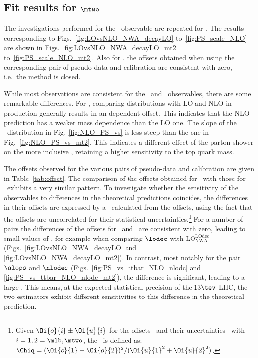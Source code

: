 \boldmath
\subsection{Fit results for $\mtwo$}
\unboldmath


The investigations performed for the \mlb\ observable are repeated for \mtwo.
%
 The results corresponding to Figs.~\ref{fig:LOvsNLO_NWA_decayLO}
 to~\ref{fig:PS_scale_NLO} are shown in Figs.~\ref{fig:LOvsNLO_NWA_decayLO_mt2}
 to~\ref{fig:PS_scale_NLO_mt2}.
%
 Also for \mtwo, the offsets obtained when using the corresponding pair of
 pseudo-data and calibration are consistent with zero, i.e.~the method is
 closed.


 While most observations are consistent for the \mlb\ and \mtwo\ observables,
 there are some remarkable differences.
%
 For \mtwo, comparing distributions with LO and NLO in production generally results in
 an \mt\-dependent offset. 
This indicates that the NLO prediction has a weaker mass dependence
than the LO one.
%
 The slope of the \mlb\ distribution in
 Fig.~\ref{fig:NLO_PS_vs} is less steep than the one in Fig.~\ref{fig:NLO_PS_vs_mt2}. This indicates a
 different effect of the parton shower
 on the more inclusive \mtwo, retaining a higher sensitivity to the
 top quark mass.


 The offsets observed for the various pairs of pseudo-data and calibration are
 given in Table~\ref{tab:offset}.
%
 The comparison of the offsets obtained for \mtwo\ with those for \mlb\
 exhibits a very similar pattern.
 To investigate whether the sensitivity of the observables to differences in the
 theoretical predictions coincides, the differences in their offsets are
 expressed by a \Chiq\ calculated from the offsets, using the fact that the
 offsets are uncorrelated for their statistical uncertainties.\footnote{Given
   $\pm {}$ for the offsets \Oi{o}{i}\ and their uncertainties
   \Oi{u}{i}\ with $i=1,2=\mlb, \mtwo$, the \Chiq\ is defined as:
   $\Chiq=(\Oi{o}{1}-\Oi{o}{2})^2/ (\Oi{u}{1}^2+\Oi{u}{2}^2)$.}
For a number of pairs the differences of the offsets for \mlb\ and \mtwo\ are
 consistent with zero, leading to small values of \Chiq,
for example when comparing $\lodec$ with $\mathrm{LO_{NWA}^{LOdec}}$
 (Figs.~\ref{fig:LOvsNLO_NWA_decayLO} and
 \ref{fig:LOvsNLO_NWA_decayLO_mt2}).
%
  In contrast, most notably for the pair $\nlops$ and $\nlodec$
(Figs.~\ref{fig:PS_vs_ttbar_NLO_nlodc} and \ref{fig:PS_vs_ttbar_NLO_nlodc_mt2}),
  the difference is significant, leading to a large \Chiq.
%
 This means, at the expected statistical precision of the $13\tev$ LHC, the two
 estimators exhibit different sensitivities to this difference in the
 theoretical prediction.

